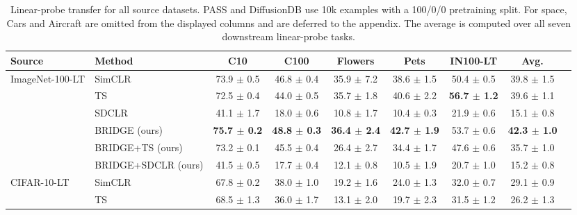 \begin{table}[t]
\centering
\tiny
\setlength{\tabcolsep}{3.5pt}
\caption{Linear-probe transfer for all source datasets. PASS and DiffusionDB use 10k examples with a 100/0/0 pretraining split. For space, Cars and Aircraft are omitted from the displayed columns and are deferred to the appendix. The average is computed over all seven downstream linear-probe tasks.}
\label{tab:main_sota_linear}
\begin{adjustbox}{max width=\textwidth}
\begin{tabular}{l l c c c c c c c}
\toprule
Source & Method & C10 & C100 & Flowers & Pets & IN100-LT & Avg. \\
\midrule
ImageNet-100-LT & SimCLR & 73.9 {\scriptsize$\pm$ 0.5} & 46.8 {\scriptsize$\pm$ 0.4} & 35.9 {\scriptsize$\pm$ 7.2} & 38.6 {\scriptsize$\pm$ 1.5} & 50.4 {\scriptsize$\pm$ 0.5} & 39.8 {\scriptsize$\pm$ 1.5} \\
 & TS & 72.5 {\scriptsize$\pm$ 0.4} & 44.0 {\scriptsize$\pm$ 0.5} & 35.7 {\scriptsize$\pm$ 1.8} & 40.6 {\scriptsize$\pm$ 2.2} & \textbf{56.7 {\scriptsize$\pm$ 1.2}} & 39.6 {\scriptsize$\pm$ 1.1} \\
 & SDCLR & 41.1 {\scriptsize$\pm$ 1.7} & 18.0 {\scriptsize$\pm$ 0.6} & 10.8 {\scriptsize$\pm$ 1.7} & 10.4 {\scriptsize$\pm$ 0.3} & 21.9 {\scriptsize$\pm$ 0.6} & 15.1 {\scriptsize$\pm$ 0.8} \\
 & BRIDGE (ours) & \textbf{75.7 {\scriptsize$\pm$ 0.2}} & \textbf{48.8 {\scriptsize$\pm$ 0.3}} & \textbf{36.4 {\scriptsize$\pm$ 2.4}} & \textbf{42.7 {\scriptsize$\pm$ 1.9}} & 53.7 {\scriptsize$\pm$ 0.6} & \textbf{42.3 {\scriptsize$\pm$ 1.0}} \\
 & BRIDGE+TS (ours) & 73.2 {\scriptsize$\pm$ 0.1} & 45.5 {\scriptsize$\pm$ 0.4} & 26.4 {\scriptsize$\pm$ 2.7} & 34.4 {\scriptsize$\pm$ 1.7} & 47.6 {\scriptsize$\pm$ 0.6} & 35.7 {\scriptsize$\pm$ 1.0} \\
 & BRIDGE+SDCLR (ours) & 41.5 {\scriptsize$\pm$ 0.5} & 17.7 {\scriptsize$\pm$ 0.4} & 12.1 {\scriptsize$\pm$ 0.8} & 10.5 {\scriptsize$\pm$ 1.9} & 20.7 {\scriptsize$\pm$ 1.0} & 15.2 {\scriptsize$\pm$ 0.8} \\
\midrule
CIFAR-10-LT & SimCLR & 67.8 {\scriptsize$\pm$ 0.2} & 38.0 {\scriptsize$\pm$ 1.0} & 19.2 {\scriptsize$\pm$ 1.6} & 24.0 {\scriptsize$\pm$ 1.3} & 32.0 {\scriptsize$\pm$ 0.7} & 29.1 {\scriptsize$\pm$ 0.9} \\
 & TS & 68.5 {\scriptsize$\pm$ 1.3} & 36.0 {\scriptsize$\pm$ 1.7} & 13.1 {\scriptsize$\pm$ 2.0} & 19.7 {\scriptsize$\pm$ 2.3} & 31.5 {\scriptsize$\pm$ 1.2} & 26.2 {\scriptsize$\pm$ 1.3} \\

\end{tabular}
\end{adjustbox}
\end{table}

